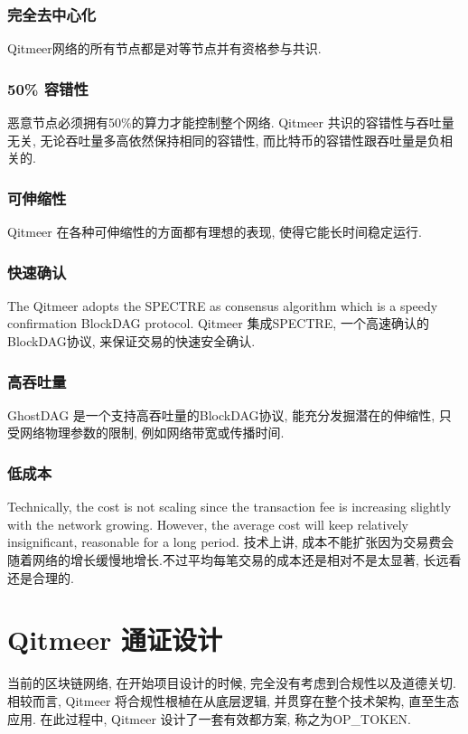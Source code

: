 \documentclass[a4paper,11pt]{article}
\begin{document}
\subsubsection*{完全去中心化}
Qitmeer网络的所有节点都是对等节点并有资格参与共识. 

\subsubsection*{50\% 容错性}
恶意节点必须拥有50\%的算力才能控制整个网络. Qitmeer 共识的容错性与吞吐量无关, 无论吞吐量多高依然保持相同的容错性, 而比特币的容错性跟吞吐量是负相关的.

\subsubsection{可伸缩性}
Qitmeer 在各种可伸缩性的方面都有理想的表现, 使得它能长时间稳定运行.

\subsubsection*{快速确认}
The Qitmeer adopts the SPECTRE as consensus algorithm which is a speedy confirmation BlockDAG protocol. 
Qitmeer 集成SPECTRE, 一个高速确认的BlockDAG协议, 来保证交易的快速安全确认.
\subsubsection*{高吞吐量}
GhostDAG 是一个支持高吞吐量的BlockDAG协议, 能充分发掘潜在的伸缩性, 只受网络物理参数的限制, 例如网络带宽或传播时间.

\subsubsection*{低成本}
Technically, the cost is not scaling since the transaction fee is increasing slightly with the network growing. However, the average cost will keep relatively insignificant, reasonable for a long period.  
技术上讲, 成本不能扩张因为交易费会随着网络的增长缓慢地增长.不过平均每笔交易的成本还是相对不是太显著, 长远看还是合理的.


\section{Qitmeer 通证设计}

当前的区块链网络, 在开始项目设计的时候, 完全没有考虑到合规性以及道德关切. 相较而言, Qitmeer 将合规性根植在从底层逻辑, 并贯穿在整个技术架构, 直至生态应用. 在此过程中, Qitmeer 设计了一套有效都方案, 称之为OP_TOKEN.
\end{document}
